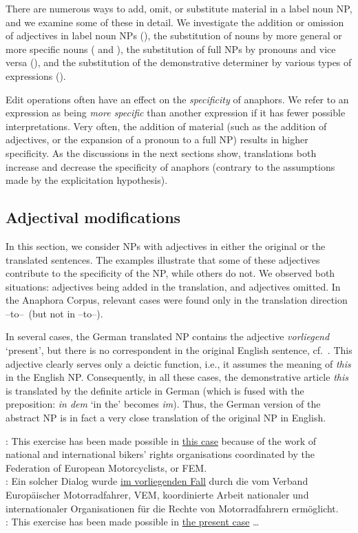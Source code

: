 \documentclass[output=paper]{LSP/langsci}
\begin{document}
There are numerous ways to add, omit, or substitute material in a label noun NP, and we examine some of these in detail. We investigate the addition or omission of adjectives in label noun NPs (), the substitution of nouns by more general or more specific nouns ( and ), the substitution of full NPs by pronouns and vice versa (), and the substitution of the demonstrative determiner by various types of expressions (). 

Edit operations often have an effect on the \textit{specificity} of anaphors. We refer to an expression as being \textit{more specific} than another expression if it has fewer possible interpretations. Very often, the addition of material (such as the addition of adjectives, or the expansion of a pronoun to a full NP) results in higher specificity. As the discussions in the next sections show, translations both increase and decrease the specificity of anaphors (contrary to the assumptions made by the explicitation hypothesis).

\subsection{Adjectival modifications}
\label{sec:adj}
In this section, we consider NPs with adjectives in either the original or the translated sentences. The examples illustrate that some of these adjectives contribute to the specificity of the NP, while others do not. We observed both situations: adjectives being added in the translation, and adjectives omitted. In the Anaphora Corpus, relevant cases were found only  in the translation direction \ENo--to--\DEt\ (but not in \DEo--to--\ENt). 

In several cases, the German translated NP contains the adjective {\it vorliegend} `present', but  there is no correspondent in the original English sentence, cf.\ . This adjective clearly serves only a deictic function, i.e., it assumes the meaning of \textit{this} in the English NP. Consequently, in all these cases, the demonstrative article \textit{this} is translated by the definite article in German (which is fused with the preposition: \textit{in dem} `in the' becomes \textit{im}). Thus, the German version of the abstract NP is in fact a very close translation of the original NP in English.

\ea	\label{ex:vorliegend} %
\ENo : This exercise has been made possible in \ul{this case} because of the work of national and international bikers' rights organisations coordinated by the Federation of European Motorcyclists, or FEM.\\
\DEt : Ein solcher Dialog wurde \ul{im vorliegenden Fall} durch die vom Verband Europ\"aischer Motorradfahrer, VEM, koordinierte Arbeit nationaler und internationaler Organisationen f\"ur die Rechte von Motorradfahrern erm\"oglicht.\\
\DElit : This exercise has been made possible in \ul{the present case} \dots 
\end{document}
